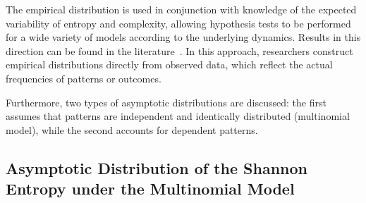 The empirical distribution is used in conjunction with knowledge of the expected variability of entropy and complexity, allowing hypothesis tests to be performed for a wide variety of models according to the underlying dynamics. Results in this direction can be found in the literature~\cite{Chagas2022a, DeMicco2008, Larrondo2005, Larrondo2006}. In this approach, researchers construct empirical distributions directly from observed data, which reflect the actual frequencies of patterns or outcomes.

Furthermore, two types of asymptotic distributions are discussed: the first assumes that patterns are independent and identically distributed (multinomial model), while the second accounts for dependent patterns.

\subsection {Asymptotic Distribution of the Shannon Entropy under the Multinomial Model}\label{Subsec:Multinomial} 

